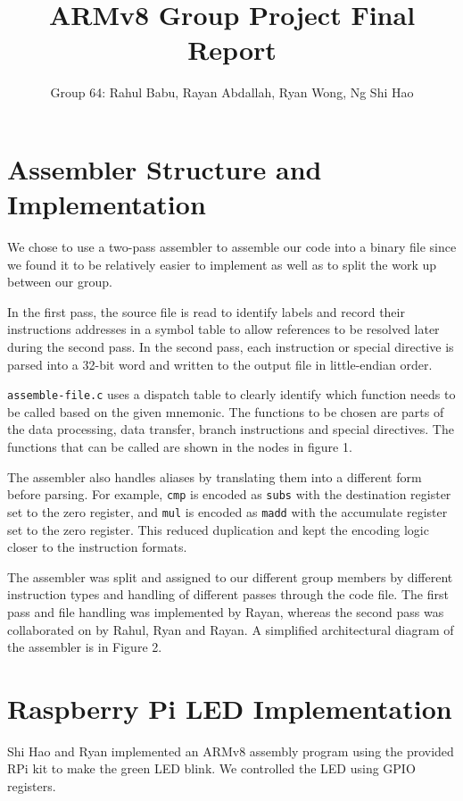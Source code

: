 \documentclass[11pt]{article}
\title{ARMv8 Group Project Final Report}
\author{Group 64: Rahul Babu, Rayan Abdallah, Ryan Wong, Ng Shi Hao}
\begin{document}
\maketitle

\section{Assembler Structure and Implementation}

We chose to use a two-pass assembler to assemble our code into a binary file since we found it to be relatively easier to implement as well as to split the work up between our group.

In the first pass, the source file is read to identify labels and record their instructions addresses in a symbol table to allow references to be resolved later during the second pass. In the second pass, each instruction or special directive is parsed into a 32-bit word and written to the output file in little-endian order. 

\texttt{assemble-file.c} uses a dispatch table to clearly identify which function needs to be called based on the given mnemonic. The functions to be chosen are parts of the data processing, data transfer, branch instructions and special directives. The functions that can be called are shown in the nodes in figure 1.

The assembler also handles aliases by translating them into a different form before parsing. For example, \texttt{cmp} is encoded as \texttt{subs} with the destination register set to the zero register, and \texttt{mul} is encoded as \texttt{madd} with the accumulate register set to the zero register. This reduced duplication and kept the encoding logic closer to the instruction formats.

The assembler was split and assigned to our different group members by different instruction types and handling of different passes through the code file. The first pass and file handling was implemented by Rayan, whereas the second pass was collaborated on by Rahul, Ryan and Rayan. A simplified architectural diagram of the assembler is in Figure 2. 

\section{Raspberry Pi LED Implementation}

Shi Hao and Ryan implemented an ARMv8 assembly program using the provided RPi kit to make the green LED blink. We controlled the LED using GPIO registers. 
\end{document}
